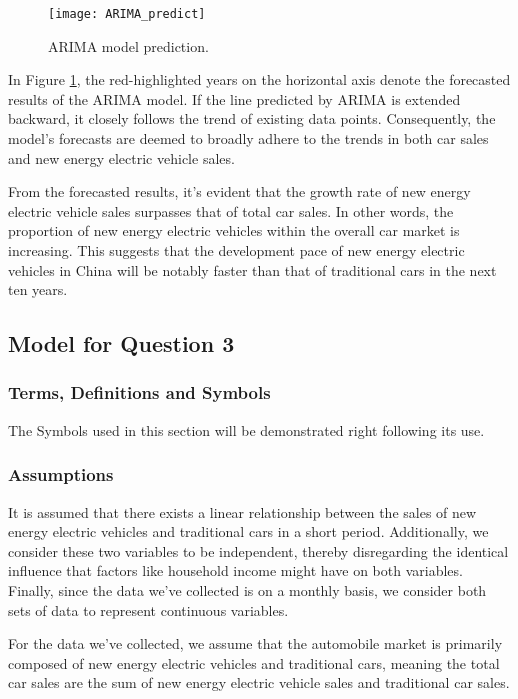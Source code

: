 \documentclass{apmcmthesis}
\begin{document}
\begin{figure}[htbp]
	\centering
	\texttt{[image: ARIMA\_predict]}
	\caption{ARIMA model prediction.}
	\label{figure 3}
\end{figure}

In Figure \ref{figure 3}, the red-highlighted years on the horizontal axis denote the forecasted results of the ARIMA model. If the line predicted by ARIMA is extended backward, it closely follows the trend of existing data points. Consequently, the model's forecasts are deemed to broadly adhere to the trends in both car sales and new energy electric vehicle sales.

From the forecasted results, it's evident that the growth rate of new energy electric vehicle sales surpasses that of total car sales. In other words, the proportion of new energy electric vehicles within the overall car market is increasing. This suggests that the development pace of new energy electric vehicles in China will be notably faster than that of traditional cars in the next ten years.


\subsection{Model for Question 3}

\subsubsection{Terms, Definitions and Symbols}

The Symbols used in this section will be demonstrated right following its use.

\subsubsection{Assumptions}

It is assumed that there exists a linear relationship between the sales of new energy electric vehicles and traditional cars in a short period. Additionally, we consider these two variables to be independent, thereby disregarding the identical influence that factors like household income might have on both variables. Finally, since the data we've collected is on a monthly basis, we consider both sets of data to represent continuous variables.

For the data we've collected, we assume that the automobile market is primarily composed of new energy electric vehicles and traditional cars, meaning the total car sales are the sum of new energy electric vehicle sales and traditional car sales.
\end{document}
